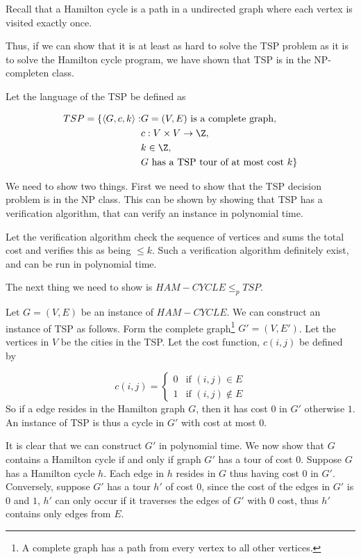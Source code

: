 \documentclass[10pt]{article}
\begin{document}
Recall that a Hamilton cycle is a path in a undirected graph where each vertex is visited exactly once.

Thus, if we can show that it is at least as hard to solve the TSP problem as it is to solve the Hamilton cycle program, we have shown that TSP is in the NP-completen class. 

Let the language of the TSP be defined as

\begin{align*}
TSP = \{\langle G, c, k \rangle : & G = (V,E) \text{ is a complete graph}, \\ 
                                  & c:V \times V \rightarrow \Z, \\
                                  & k \in \Z, \\
                                  & \text{$G$ has a TSP tour of at most cost $k$}\}
\end{align*}


We need to show two things. First we need to show that the TSP decision problem is in the NP class. This can be shown by showing that TSP has a verification algorithm, that can verify an instance in polynomial time. 

Let the verification algorithm check the sequence of vertices and sums the total cost and verifies this as being $\leq k$. Such a verification algorithm definitely exist, and can be run in polynomial time.

The next thing we need to show is $HAM-CYCLE \leq_p TSP$. 

Let $G=(V,E)$ be an instance of $HAM-CYCLE$. We can construct an instance of TSP as follows. Form the complete graph\footnote{A complete graph has a path from every vertex to all other vertices.} $G' = (V,E')$. Let the vertices in $V$ be the cities in the TSP. Let the cost function, $c(i,j)$ be defined by

\begin{equation} 
c(i,j) = 
\left\{
\begin{array}{rl} 
  0 & \text{if } (i,j) \in E \\
  1 & \text{if } (i,j) \notin E 
\end{array} 
\right. 
\end{equation} 
So if a edge resides in the Hamilton graph $G$, then it has cost $0$ in $G'$ otherwise $1$. An instance of TSP is thus a cycle in $G'$ with cost at most $0$.

It is clear that we can construct $G'$ in polynomial time. We now show that $G$ contains a Hamilton cycle if and only if graph $G'$ has a tour of cost $0$. Suppose $G$ has a Hamilton cycle $h$. Each edge in $h$ resides in $G$ thus having cost $0$ in $G'$. Conversely, suppose $G'$ has a tour $h'$ of cost $0$, since the cost of the edges in $G'$ is $0$ and $1$, $h'$ can only occur if it traverses the edges of $G'$ with $0$ cost, thus $h'$ contains only edges from $E$.  
\end{document}
